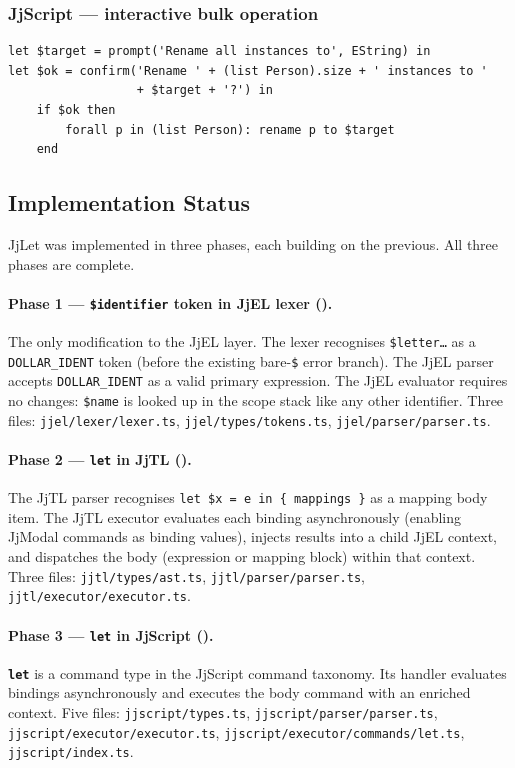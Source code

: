\documentclass[11pt,a4paper]{article}
\newcommand{\jjmodal}{\textsf{JjModal}}
\newcommand{\jjlet}{\textsf{JjLet}}
\newcommand{\jjel}{\textsf{JjEL}}
\newcommand{\jjtl}{\textsf{JjTL}}
\newcommand{\kw}[1]{\texttt{\textbf{#1}}}
\begin{document}
\subsubsection{JjScript --- interactive bulk operation}

\begin{lstlisting}[style=jjel,caption={JjLet in JjScript}]
let $target = prompt('Rename all instances to', EString) in
let $ok = confirm('Rename ' + (list Person).size + ' instances to '
                  + $target + '?') in
    if $ok then
        forall p in (list Person): rename p to $target
    end
\end{lstlisting}


\subsection{Implementation Status}

\jjlet{} was implemented in three phases, each building on the previous. All three phases are complete.

\paragraph{Phase 1 --- \texttt{\$identifier} token in \jjel{} lexer (\checkmark).}
The only modification to the \jjel{} layer. The lexer
recognises \texttt{\$letter\ldots} as a
\texttt{DOLLAR\_IDENT} token (before the existing bare-\texttt{\$}
error branch). The \jjel{} parser accepts \texttt{DOLLAR\_IDENT} as a
valid primary expression. The \jjel{} evaluator requires no changes:
\texttt{\$name} is looked up in the scope stack like any other
identifier. Three files: \texttt{jjel/lexer/lexer.ts},
\texttt{jjel/types/tokens.ts}, \texttt{jjel/parser/parser.ts}.

\paragraph{Phase 2 --- \kw{let} in JjTL (\checkmark).}
The \jjtl{} parser recognises
\texttt{let \$x = e in \{ mappings \}} as a mapping body item.
The \jjtl{} executor evaluates each binding asynchronously (enabling
\jjmodal{} commands as binding values), injects results into a child
\jjel{} context, and dispatches the body (expression or mapping block)
within that context. Three files: \texttt{jjtl/types/ast.ts},
\texttt{jjtl/parser/parser.ts}, \texttt{jjtl/executor/executor.ts}.

\paragraph{Phase 3 --- \kw{let} in \textsf{JjScript} (\checkmark).}
\kw{let} is a command type in the \textsf{JjScript} command
taxonomy. Its handler evaluates bindings asynchronously and executes the
body command with an enriched context. Five files:
\texttt{jjscript/types.ts}, \texttt{jjscript/parser/parser.ts},
\texttt{jjscript/executor/executor.ts},
\texttt{jjscript/executor/commands/let.ts},
\texttt{jjscript/index.ts}.
\end{document}
